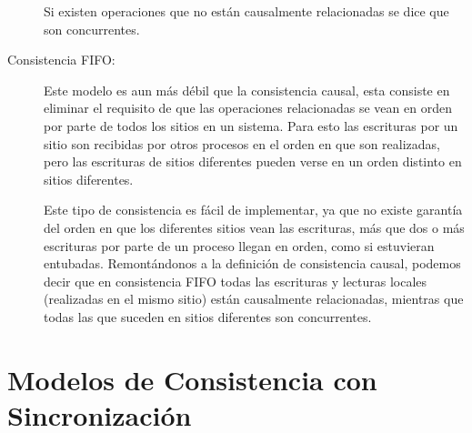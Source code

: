 \begin{description}
Si existen operaciones que no están causalmente relacionadas se dice que son concurrentes.

\item[Consistencia FIFO: ]
Este modelo es aun más débil que la consistencia causal, esta consiste en eliminar el requisito de que las operaciones relacionadas se vean en orden por parte de todos los sitios en un sistema. Para esto las escrituras por un sitio son recibidas por otros procesos en el orden en que son realizadas, pero las escrituras de sitios diferentes pueden verse en un orden distinto en sitios diferentes.

Este tipo de consistencia es fácil de implementar, ya que no existe garantía del orden en que los diferentes sitios vean las escrituras, más que dos o más escrituras por parte de un proceso llegan en orden, como si estuvieran entubadas. Remontándonos a la definición de consistencia causal, podemos decir que en consistencia FIFO todas las escrituras y lecturas locales (realizadas en el mismo sitio) están causalmente relacionadas, mientras que todas las que suceden en sitios diferentes son concurrentes.


\end{description}


\section{Modelos de Consistencia con Sincronización}

